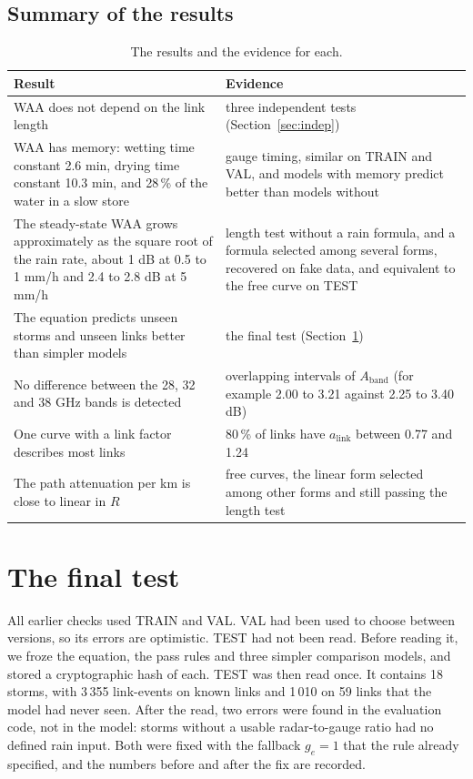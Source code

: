 \documentclass[11pt,a4paper]{article}
\newcommand{\alink}{a_{\mathrm{link}}}
\newcommand{\Aband}{A_{\mathrm{band}}}
\begin{document}
\subsection{Summary of the results}
\begin{table}[H]
\centering\small
\caption{The results and the evidence for each.}
\label{tab:results}
\begin{tabularx}{\textwidth}{LL}
\toprule
Result & Evidence\\
\midrule
WAA does not depend on the link length & three independent tests (Section~\ref{sec:indep})\\
WAA has memory: wetting time constant 2.6 min, drying time constant 10.3 min, and 28\,\% of the water in a slow store & gauge timing, similar on TRAIN and VAL, and models with memory predict better than models without\\
The steady-state WAA grows approximately as the square root of the rain rate, about 1 dB at 0.5 to 1 mm/h and 2.4 to 2.8 dB at 5 mm/h & length test without a rain formula, and a formula selected among several forms, recovered on fake data, and equivalent to the free curve on TEST\\
The equation predicts unseen storms and unseen links better than simpler models & the final test (Section~\ref{sec:test})\\
No difference between the 28, 32 and 38 GHz bands is detected & overlapping intervals of $\Aband$ (for example 2.00 to 3.21 against 2.25 to 3.40 dB)\\
One curve with a link factor describes most links & 80\,\% of links have $\alink$ between 0.77 and 1.24\\
The path attenuation per km is close to linear in $R$ & free curves, the linear form selected among other forms and still passing the length test\\
\bottomrule
\end{tabularx}
\end{table}

\section{The final test}
\label{sec:test}
All earlier checks used TRAIN and VAL. VAL had been used to choose between versions, so its errors are optimistic. TEST had not
been read. Before reading it, we froze the equation, the pass rules and three simpler comparison models, and stored a
cryptographic hash of each. TEST was then read once. It contains 18 storms, with 3\,355 link-events on known links and 1\,010 on
59 links that the model had never seen. After the read, two errors were found in the evaluation code, not in the model: storms
without a usable radar-to-gauge ratio had no defined rain input. Both were fixed with the fallback $g_e = 1$ that the rule already
specified, and the numbers before and after the fix are recorded.
\end{document}
